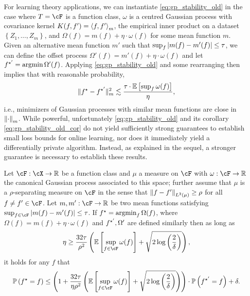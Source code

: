 For learning theory applications, we can instantiate \eqref{eq:gp_stability_old} in the case where $T = \cF$ is a function class, $\omega$ is a centred Gaussian process with covariance kernel $K(f, f') = \left\langle f, f' \right\rangle_m$, the empirical inner product on a dataset $\left\{ Z_1, \dots, Z_m \right\}$, and $\Omega(f) = m(f) + \eta \cdot \omega(f)$ for some mean function $m$.  Given an alternative mean function $m'$ such that $\sup_f \left|m(f) - m'(f)\right| \leq \tau$, we can define the offset process $\Omega'(f) = m'(f) + \eta \cdot \omega(f)$ and let $f^{\star'} = \operatorname*{argmin} \Omega'(f)$.  Applying \eqref{eq:gp_stability_old} and some rearranging then implies that with reasonable probability,
\begin{align}\label{eq:gp_stability_old_cor}
    \|f^\star - f^{\star'}\|_m^2 \lesssim \frac{\tau \cdot \mathbb{E}\left[ \sup_f \omega(f)\right]}{\eta},
\end{align}
i.e., minimizers of Gaussian processes with similar mean functions are close in $\left\|\cdot\right\|_m$.  While powerful, unfortunately \eqref{eq:gp_stability_old} and its corollary \eqref{eq:gp_stability_old_cor} do not yield sufficiently strong guarantees to establish small loss bounds for online learning, nor does it immediately yield a differentially private algorithm.  Instead, as explained in the sequel, a stronger guarantee is necessary to establish these results. 
\begin{lemma}\label{lem:gp_stability_cor}
    Let $\cF: \cX \to \rr$ be a function class and $\mu$ a measure on $\cF$ with $\omega: \cF \to \rr$ the canonical Gaussian process associated to this space; further assume that $\mu$ is a $\rho$-separating measure on $\cF$ in the sense that $\left\|f -f '\right\|_{L^2(\mu)} \geq \rho$ for all $f \neq f' \in \cF$.  
    Let $m,m': \cF \to \rr$ be two mean functions satisfying $\sup_{f \in \cF} \abs{m(f) - m'(f)} \leq \tau$.  If $f^\star = \operatorname*{argmin}_f \Omega(f)$, where $\Omega(f) = m(f) + \eta \cdot \omega(f)$ and $f^{\star'}, \Omega'$ are defined similarly then as long as 
    \begin{align}\label{eq:gp_dp_bound_eta}
        \eta \geq \frac{32\tau}{ \rho^2} \left( \ee\left[ \sup_{f \in \cF} \omega(f) \right] + \sqrt{2\log\left( \frac 2\delta \right)} \right),
    \end{align}
    it holds for any $f$ that
    \begin{align}\label{eq:gp_dp_bound}
        \pp\left( \fstar = f \right) \leq \left( 1 + \frac{32 \tau}{\eta \rho^2} \left( \ee\left[ \sup_{f \in \cF} \omega(f) \right] + \sqrt{2 \log\left( \frac 2\delta \right)} \right) \right) \cdot \pp\left( \fstarp = f \right) + \delta.
    \end{align}
\end{lemma}
